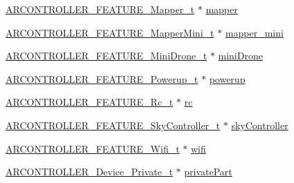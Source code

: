 \begin{DoxyCompactItemize}
\item 
\hyperlink{struct_a_r_c_o_n_t_r_o_l_l_e_r___f_e_a_t_u_r_e___mapper__t}{A\+R\+C\+O\+N\+T\+R\+O\+L\+L\+E\+R\+\_\+\+F\+E\+A\+T\+U\+R\+E\+\_\+\+Mapper\+\_\+t} $\ast$ \hyperlink{struct_a_r_c_o_n_t_r_o_l_l_e_r___device__t_aefdbf5a802396c4584758a54132df634}{mapper}
\item 
\hyperlink{struct_a_r_c_o_n_t_r_o_l_l_e_r___f_e_a_t_u_r_e___mapper_mini__t}{A\+R\+C\+O\+N\+T\+R\+O\+L\+L\+E\+R\+\_\+\+F\+E\+A\+T\+U\+R\+E\+\_\+\+Mapper\+Mini\+\_\+t} $\ast$ \hyperlink{struct_a_r_c_o_n_t_r_o_l_l_e_r___device__t_adb250955cbad0cbc6749897c34785440}{mapper\+\_\+mini}
\item 
\hyperlink{struct_a_r_c_o_n_t_r_o_l_l_e_r___f_e_a_t_u_r_e___mini_drone__t}{A\+R\+C\+O\+N\+T\+R\+O\+L\+L\+E\+R\+\_\+\+F\+E\+A\+T\+U\+R\+E\+\_\+\+Mini\+Drone\+\_\+t} $\ast$ \hyperlink{struct_a_r_c_o_n_t_r_o_l_l_e_r___device__t_a14262801f3642811efb6d44e07df9788}{mini\+Drone}
\item 
\hyperlink{struct_a_r_c_o_n_t_r_o_l_l_e_r___f_e_a_t_u_r_e___powerup__t}{A\+R\+C\+O\+N\+T\+R\+O\+L\+L\+E\+R\+\_\+\+F\+E\+A\+T\+U\+R\+E\+\_\+\+Powerup\+\_\+t} $\ast$ \hyperlink{struct_a_r_c_o_n_t_r_o_l_l_e_r___device__t_ab124ca81eee24767c868ea1121746fa9}{powerup}
\item 
\hyperlink{struct_a_r_c_o_n_t_r_o_l_l_e_r___f_e_a_t_u_r_e___rc__t}{A\+R\+C\+O\+N\+T\+R\+O\+L\+L\+E\+R\+\_\+\+F\+E\+A\+T\+U\+R\+E\+\_\+\+Rc\+\_\+t} $\ast$ \hyperlink{struct_a_r_c_o_n_t_r_o_l_l_e_r___device__t_a03cc3d5f952f281e823a5c4d221bf810}{rc}
\item 
\hyperlink{struct_a_r_c_o_n_t_r_o_l_l_e_r___f_e_a_t_u_r_e___sky_controller__t}{A\+R\+C\+O\+N\+T\+R\+O\+L\+L\+E\+R\+\_\+\+F\+E\+A\+T\+U\+R\+E\+\_\+\+Sky\+Controller\+\_\+t} $\ast$ \hyperlink{struct_a_r_c_o_n_t_r_o_l_l_e_r___device__t_a47ff323cbab9d95bbcdb1ecbc3bc2fb4}{sky\+Controller}
\item 
\hyperlink{struct_a_r_c_o_n_t_r_o_l_l_e_r___f_e_a_t_u_r_e___wifi__t}{A\+R\+C\+O\+N\+T\+R\+O\+L\+L\+E\+R\+\_\+\+F\+E\+A\+T\+U\+R\+E\+\_\+\+Wifi\+\_\+t} $\ast$ \hyperlink{struct_a_r_c_o_n_t_r_o_l_l_e_r___device__t_ac67bc8885a15843e6fd67c3f04913325}{wifi}
\item 
\hyperlink{_a_r_c_o_n_t_r_o_l_l_e_r___device_8h_a25af8c4f157cb94b6d908a91d5ff046b}{A\+R\+C\+O\+N\+T\+R\+O\+L\+L\+E\+R\+\_\+\+Device\+\_\+\+Private\+\_\+t} $\ast$ \hyperlink{struct_a_r_c_o_n_t_r_o_l_l_e_r___device__t_a53ac6a132cd380df0a88bf5985f7ee1b}{private\+Part}
\end{DoxyCompactItemize}


